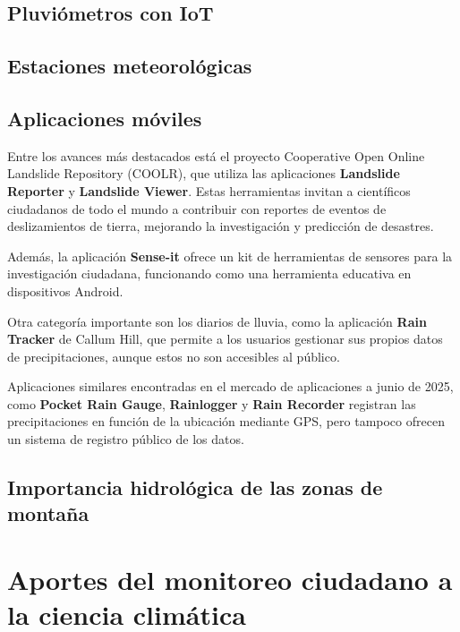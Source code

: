 \subsection{Pluviómetros con IoT}

\subsection{Estaciones meteorológicas}














\subsection{Aplicaciones móviles}

Entre los avances más destacados está el proyecto Cooperative Open Online Landslide Repository (COOLR), que utiliza las aplicaciones \textbf{Landslide Reporter} y \textbf{Landslide Viewer}. Estas herramientas invitan a científicos ciudadanos de todo el mundo a contribuir con reportes de eventos de deslizamientos de tierra, mejorando la investigación y predicción de desastres.\cite{coolr2021} 

Además, la aplicación \textbf{Sense-it} ofrece un kit de herramientas de sensores para la investigación ciudadana, funcionando como una herramienta educativa en dispositivos Android.\cite{van2017senseit}


Otra categoría importante son los diarios de lluvia, como la aplicación \textbf{Rain Tracker} de Callum Hill, que permite a los usuarios gestionar sus propios datos de precipitaciones, aunque estos no son accesibles al público. \cite{hill2021raintracker}

Aplicaciones similares encontradas en el mercado de aplicaciones a junio de 2025, como \textbf{Pocket Rain Gauge}, \textbf{Rainlogger} y \textbf{Rain Recorder} registran las precipitaciones en función de la ubicación mediante GPS, pero tampoco ofrecen un sistema de registro público de los datos.


\subsection{Importancia hidrológica de las zonas de montaña}


\section{Aportes del monitoreo ciudadano a la ciencia climática}







